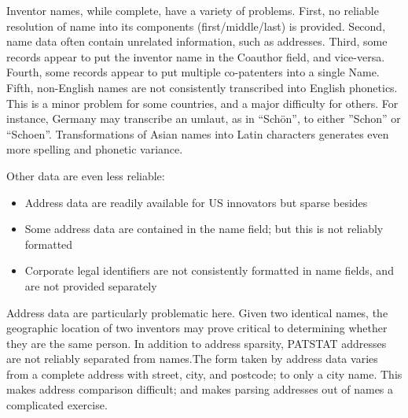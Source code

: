 \documentclass[11pt]{article}
\begin{document}
Inventor names, while complete, have a variety of problems. First, no
reliable resolution of name into its components (first/middle/last) is
provided. Second, name data often contain unrelated information, such
as addresses. Third, some records appear to put the inventor name in
the Coauthor field, and vice-versa. Fourth, some records appear to put multiple
co-patenters into a single Name. Fifth, non-English names are not
consistently transcribed into English phonetics. This is a minor
problem for some countries, and a major difficulty for others. For
instance, Germany may transcribe an umlaut, as in
``Sch\"on'', to either ''Schon'' or  ``Schoen''. Transformations of
Asian names into Latin characters generates even more spelling and
phonetic variance.

Other data are even less reliable:
\begin{itemize}
\item Address data are readily available for US innovators but sparse besides
\item Some address data are contained in the name field; but this is
  not reliably formatted
\item Corporate legal identifiers are not consistently formatted in
  name fields, and are not provided separately
\end{itemize}

Address data are particularly problematic here. Given two identical
names, the geographic location of two inventors may prove critical to
determining whether they are the same person. In addition to address
sparsity, PATSTAT addresses are not reliably separated from names.The
form taken by address data varies from a complete address with street,
city, and postcode; to only a city name. This makes address
comparison difficult; and makes parsing addresses out of names a
complicated exercise.

\end{document}
